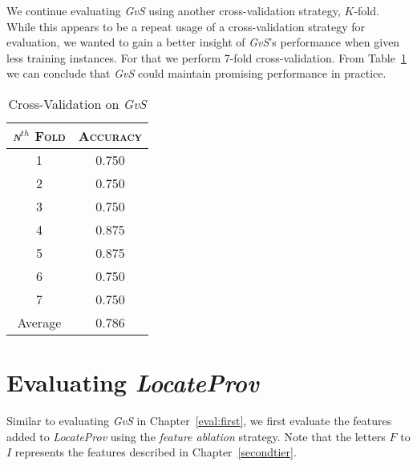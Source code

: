 We continue evaluating \textit{GvS} using another cross-validation strategy, $K$-fold. While this appears to be a repeat usage of a cross-validation strategy for evaluation, we wanted to gain a better insight of \textit{GvS}'s performance when given less training instances. For that we perform 7-fold cross-validation. From Table~\ref{tab:crossvalidation} we can conclude that \textit{GvS} could maintain promising performance in practice.
\begin{table}[h]
	\singlespacingplus
	\center
	\begin{tabular}{ c c }
		\textsc{{\it n}$^{th}$ Fold} & \textsc{Accuracy} \\
		\hline
		1 & 0.750 \\
		2 & 0.750 \\
		3 & 0.750 \\
		4 & 0.875 \\
		5 & 0.875 \\
		6 & 0.750 \\
		7 & 0.750 \\
		Average & 0.786 \\
	\end{tabular}
	\caption{Cross-Validation on {\it GvS}}
	\label{tab:crossvalidation}
\end{table}

\section{Evaluating {\it LocateProv}}
\label{eval:second}
Similar to evaluating \textit{GvS} in Chapter~\ref{eval:first}, we first evaluate the features added to \textit{LocateProv} using the \textit{feature ablation} strategy. Note that the letters $F$ to $I$ represents the features described in Chapter~\ref{secondtier}.


